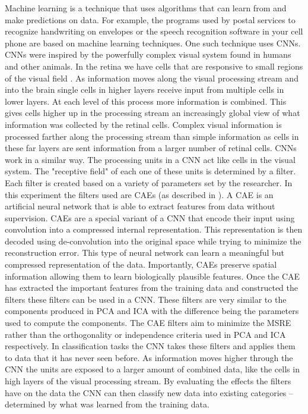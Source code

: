 Machine learning is a technique that uses algorithms that can learn from and make predictions on data.
For example, the programs used by postal services to recognize handwriting on envelopes or the speech recognition software in your cell phone are based on machine learning techniques.
One such technique uses \acp{CNN}. 
\acp{CNN} were inspired by the powerfully complex visual system found in humans and other animals.
In the retina we have cells that are responsive to small regions of the visual field \cite{hubel_receptive_1963}. 
As information moves along the visual processing stream and into the brain single cells in higher layers receive input from multiple cells in lower layers.
At each level of this process more information is combined.
This gives cells higher up in the processing stream an increasingly global view of what information was collected by the retinal cells.
Complex visual information is processed farther along the processing stream than simple information as cells in these far layers are sent information from a larger number of retinal cells.
\acp{CNN} work in a similar way.
The processing units in a \ac{CNN} act like cells in the visual system.
The "receptive field" of each one of these units is determined by a filter.
Each filter is created based on a variety of parameters set by the researcher.
In this experiment the filters used are \acp{CAE} (as described in \cite{masci_stacked_2011}).
A \ac{CAE} is an artificial neural network that is able to extract features from data without supervision.
CAEs are a special variant of a \ac{CNN} that encode their input using convolution into a compressed internal representation. 
This representation is then decoded using de-convolution into the original space while trying to minimize the reconstruction error. 
This type of neural network can learn a meaningful but compressed representation of the data.
Importantly, \acp{CAE} preserve spatial information allowing them to learn biologically plausible features.
Once the \ac{CAE} has extracted the important features from the training data and constructed the filters these filters can be used in a \ac{CNN}.
These filters are very similar to the components produced in \ac{PCA} and \ac{ICA} with the difference being the parameters used to compute the components. 
The \ac{CAE} filters aim to minimize the \ac{MSRE} rather than the orthogonality or independence criteria used in \ac{PCA} and \ac{ICA} respectively. 
In classification tasks the \ac{CNN} takes these filters and applies them to data that it has never seen before.
As information moves higher through the \ac{CNN} the units are exposed to a larger amount of combined data, like the cells in high layers of the visual processing stream. 
By evaluating the effects the filters have on the data the \ac{CNN} can then classify new data into existing categories -- determined by what was learned from the training data.

